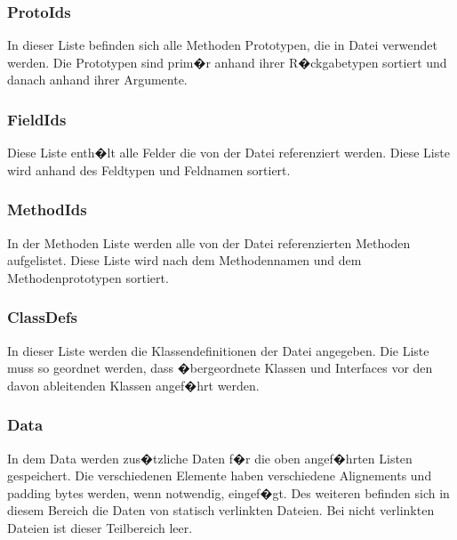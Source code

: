 \documentclass[11pt,conference,a4paper]{IEEEtran}
\begin{document}
\subsubsection{ProtoIds}
In dieser Liste befinden sich alle Methoden Prototypen, die in  Datei verwendet werden. Die Prototypen sind prim�r anhand ihrer R�ckgabetypen sortiert und danach anhand ihrer Argumente.

\subsubsection{FieldIds}
Diese Liste enth�lt alle Felder die von der  Datei referenziert werden. Diese Liste wird anhand des Feldtypen und Feldnamen sortiert.

\subsubsection{MethodIds}
In der Methoden Liste werden alle von der  Datei referenzierten Methoden aufgelistet. Diese Liste wird nach dem Methodennamen und dem Methodenprototypen sortiert.

\subsubsection{ClassDefs}
In dieser Liste werden die Klassendefinitionen der  Datei angegeben. Die Liste muss so geordnet werden, dass �bergeordnete Klassen und Interfaces vor den davon ableitenden Klassen angef�hrt werden.

\subsubsection{Data}
In dem Data werden zus�tzliche Daten f�r die oben angef�hrten Listen gespeichert. Die verschiedenen Elemente haben verschiedene Alignements und padding bytes werden, wenn notwendig, eingef�gt. Des weiteren befinden sich in diesem Bereich die Daten von statisch verlinkten Dateien. Bei nicht verlinkten Dateien ist dieser Teilbereich leer.
\end{document}
